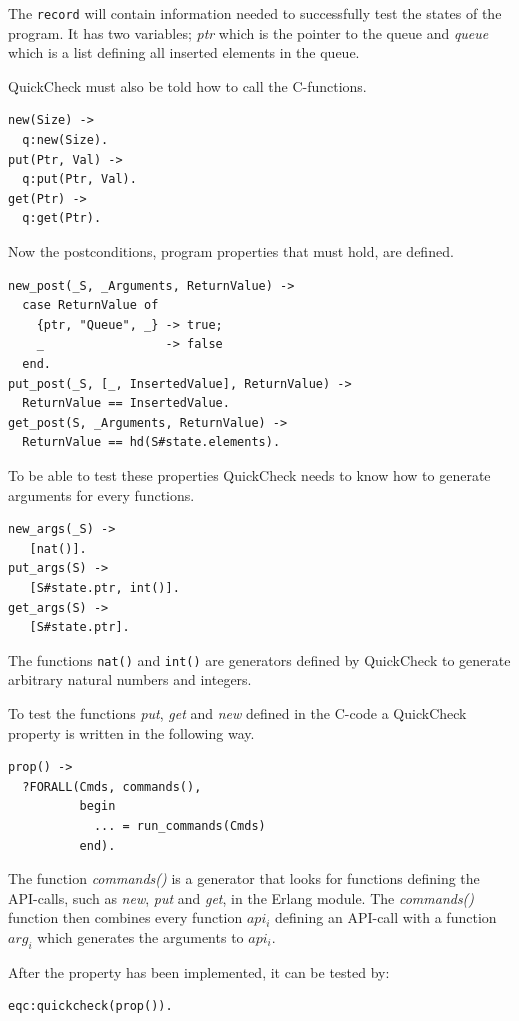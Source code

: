 The \lstinline!record! will contain information needed to successfully
test the states of the program. It has two variables;
\emph{ptr} which is the pointer to the queue and
\emph{queue} which is a list defining all inserted elements in the queue.

QuickCheck must also be told how to call the C-functions.
\begin{lstlisting}
new(Size) ->
  q:new(Size).
put(Ptr, Val) ->
  q:put(Ptr, Val).
get(Ptr) ->
  q:get(Ptr).
\end{lstlisting}

Now the postconditions, program properties that must hold, are defined.
\begin{lstlisting}
new_post(_S, _Arguments, ReturnValue) ->
  case ReturnValue of
    {ptr, "Queue", _} -> true;
    _                 -> false
  end.
put_post(_S, [_, InsertedValue], ReturnValue) ->
  ReturnValue == InsertedValue.
get_post(S, _Arguments, ReturnValue) ->
  ReturnValue == hd(S#state.elements).
\end{lstlisting}

To be able to test these properties QuickCheck needs to know how to generate
arguments for every functions.
\begin{lstlisting}
new_args(_S) ->
   [nat()].
put_args(S) ->
   [S#state.ptr, int()].
get_args(S) ->
   [S#state.ptr].
\end{lstlisting}
The functions \lstinline!nat()! and \lstinline!int()! are generators
defined by QuickCheck to generate arbitrary natural numbers and integers.

To test the functions \emph{put}, \emph{get} and \emph{new} defined in the C-code a QuickCheck
property is written in the following way.  \lstset{style=erlang}
\begin{lstlisting}
prop() ->
  ?FORALL(Cmds, commands(),
          begin
            ... = run_commands(Cmds)
          end).
\end{lstlisting}

The function \emph{commands()} is a generator that looks
for functions defining the API-calls, such as \emph{new}, \emph{put} and
\emph{get}, in the Erlang module. The \emph{commands()} function then combines
every function $api_i$ defining an API-call with a function $arg_i$ which
generates the arguments to $api_i$.

After the property has been implemented, it can be tested by:

\begin{lstlisting}
eqc:quickcheck(prop()).
\end{lstlisting}

